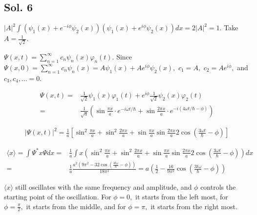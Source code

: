 \subsection*{Sol. 6}
    
    $|A|^2\int (\psi_1(x)+e^{-i\phi}\psi_2(x))(\psi_1(x)+e^{i\phi}\psi_2(x))dx
        =2|A|^2=1.$ Take $A=\frac{1}{\sqrt{2}}.$
        
        $\Psi(x, t) = \sum_{n=1}^\infty c_n\psi_n(x)\varphi_n(t).$
    Since $\Psi(x,0)=\sum_{n=1}^\infty c_n\psi_n(x) = A\psi_1(x)+Ae^{i\phi}\psi_2(x),$ $c_1=A,$ $c_2=Ae^{i\phi},$ and $c_3, c_4, \dots = 0.$

    \begin{align*}
    \Psi(x, t)= & 
    \frac{1}{\sqrt{2}}\psi_1(x)\varphi_1(t) + 
    e^{i\phi}\frac{1}{\sqrt{2}}\psi_2(x)\varphi_2(t)\\
    =& \frac{1}{\sqrt{a}}
    \left(
    \sin\frac{\pi x}{a}\cdot e^{-i\omega t/\hbar} + 
    \sin\frac{2\pi x}{a}\cdot e^{-i(4\omega t/\hbar-\phi)}
    \right)
    \end{align*}

    \begin{align*}
        |\Psi(x,t)|^2=\frac{1}{a}
        \left[
    \sin^2\frac{\pi x}{a}
    +\sin^2\frac{2\pi x}{a}
    +\sin\frac{\pi x}{a} \sin\frac{2\pi x}{a}
    2\cos\left(\frac{3\omega t}{\hbar}-\phi\right)
    \right]
    \end{align*}
    
\begin{align*}
    \langle x\rangle = \int\Psi^*x\Psi dx= & 
    \frac{1}{a} \int x(
    \sin^2\frac{\pi x}{a}
    +\sin^2\frac{2\pi x}{a}
    +\sin\frac{\pi x}{a} \sin\frac{2\pi x}{a}
    2\cos\left(\frac{3\omega t}{\hbar}-\phi\right)
    )dx\\
    =& \frac{1}{a}\frac{a^2(9\pi^2-32\cos(\frac{3t\omega}{\hbar}-\phi))}{18\pi^2}
    =a\left(\frac{1}{2}-\frac{16}{9\pi^2}\cos(\frac{3t\omega}{\hbar}-\phi)
    \right)
\end{align*}

$\langle x\rangle$ still oscillates with the same frequency and amplitude, and $\phi$ controls the starting point of the oscillation. 
For $\phi=0,$ it starts from the left most, for $\phi=\frac{\pi}{2},$ it starts from the middle, and for $\phi=\pi,$ it starts from the right most.


